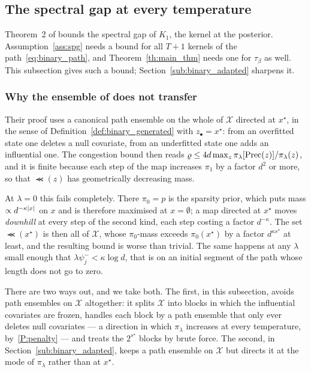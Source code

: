 \documentclass[aos]{imsart}%
\DeclarePairedDelimiter{\abs}{\lvert}{\rvert}
\newcommand{\ambientspace}[0]{\mathcal{X}}
\theoremstyle{plain}
\theoremstyle{definition}
\begin{document}
    \subsection{The spectral gap at every temperature}
    \label{sub:binary_gap}

    Theorem~2 of \citet{YangWainwrightJordan2016} bounds the spectral gap of
    $K_1$, the kernel at the posterior. Assumption~\ref{ass:spg} needs a bound
    for all $T+1$ kernels of the path~\eqref{eq:binary_path}, and
    Theorem~\ref{th:main_thm} needs one for $\tau_\beta$ as well. This
    subsection gives such a bound; Section~\ref{sub:binary_adapted} sharpens it.

    \subsubsection{Why the ensemble of \citeauthor{YangWainwrightJordan2016}
    does not transfer}

    Their proof uses a canonical path ensemble on the whole of $\ambientspace$
    directed at $x^{\star}$, in the sense of
    Definition~\ref{def:binary_generated} with $z_\bullet=x^{\star}$: from an
    overfitted state one deletes a null covariate, from an underfitted state
    one adds an influential one. The congestion bound then
    reads $\varrho\leq4d\max_z\pi_\lambda[\mathrm{Prec}(z)]/\pi_\lambda(z)$, and it is
    finite because each step of the map increases $\pi_1$ by a factor $d^{2}$
    or more, so that $\Prec(z)$ has geometrically decreasing mass.

    At $\lambda=0$ this fails completely. There $\pi_0=p$ is the sparsity prior,
    which puts mass $\propto d^{-\kappa\abs x}$ on $x$ and is therefore
    maximised at $x=\emptyset$; a map directed at $x^{\star}$ moves
    \emph{downhill} at every step of the second kind, each step costing a factor
    $d^{-\kappa}$. The set $\Prec(x^{\star})$ is then all of $\ambientspace$,
    whose $\pi_0$-mass exceeds $\pi_0(x^{\star})$ by a factor
    $d^{\kappa s^{\star}}$ at least, and the resulting bound is worse than
    trivial. The same happens at any $\lambda$ small enough that
    $\lambda\psi_j^{-}<\kappa\log d$, that is on an initial segment of the path
    whose length does not go to zero.

    There are two ways out, and we take both. The first, in this subsection,
    avoids path ensembles on $\ambientspace$ altogether: it splits
    $\ambientspace$ into blocks in which the influential covariates are frozen,
    handles each block by a path ensemble that only ever deletes null
    covariates --- a direction in which $\pi_\lambda$ increases at every
    temperature, by~\ref{P:penalty} --- and treats the $2^{s^{\star}}$ blocks by
    brute force. The second, in Section~\ref{sub:binary_adapted}, keeps a path
    ensemble on $\ambientspace$ but directs it at the mode of $\pi_\lambda$
    rather than at $x^{\star}$.
\end{document}
